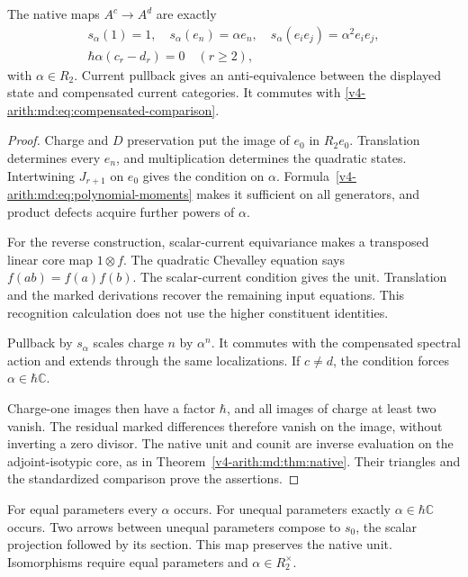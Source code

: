 \begin{proposition}
\label{v4-arith:md:prop:moment-arrows}
The native maps $A^c\to A^d$ are exactly
\[
 \begin{gathered}
 s_\alpha(1)=1,\quad s_\alpha(e_n)=\alpha e_n,\quad
 s_\alpha(e_ie_j)=\alpha^2e_ie_j,\\
 \hbar\alpha(c_r-d_r)=0\quad(r\geq2),
 \end{gathered}
\]
with $\alpha\in R_2$.
Current pullback gives an anti-equivalence
between the displayed state and compensated
current categories. It commutes with
\eqref{v4-arith:md:eq:compensated-comparison}.
\end{proposition}

\begin{proof}
Charge and $D$ preservation put the image
of $e_0$ in $R_2e_0$.
Translation determines every $e_n$,
and multiplication determines the
quadratic states.
Intertwining $J_{r+1}$ on $e_0$ gives
the condition on $\alpha$.
Formula~\eqref{v4-arith:md:eq:polynomial-moments}
makes it sufficient on all generators,
and product defects acquire further
powers of $\alpha$.

For the reverse construction, scalar-current
equivariance makes a transposed linear
core map $1\otimes f$.
The quadratic Chevalley equation says
$f(ab)=f(a)f(b)$. The scalar-current
condition gives the unit.
Translation and the marked derivations
recover the remaining input equations.
This recognition calculation does not
use the higher constituent identities.

Pullback by $s_\alpha$ scales charge $n$
by $\alpha^n$. It commutes with the
compensated spectral action and extends
through the same localizations.
If $c\ne d$, the condition forces
$\alpha\in\hbar\mathbb C$.

Charge-one images then have a factor
$\hbar$, and all images of charge at
least two vanish. The residual marked
differences therefore vanish on the
image, without inverting a zero divisor.
The native unit and counit are inverse
evaluation on the adjoint-isotypic core,
as in Theorem~\ref{v4-arith:md:thm:native}.
Their triangles and the standardized
comparison prove the assertions.
\end{proof}

For equal parameters every $\alpha$ occurs.
For unequal parameters exactly
$\alpha\in\hbar\mathbb C$ occurs.
Two arrows between unequal parameters
compose to $s_0$, the scalar projection
followed by its section. This map
preserves the native unit.
Isomorphisms require equal parameters
and $\alpha\in R_2^\times$.

